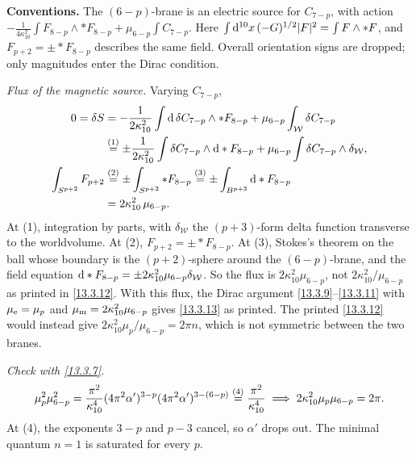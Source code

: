 \begin{tcolorbox}[breakable]
	\begin{remark}
		\textbf{Conventions.} The $(6-p)$-brane is an electric source for $C_{7-p}$, with action $-\frac{1}{4\kappa_{10}^2}\int F_{8-p}\wedge*F_{8-p}+\mu_{6-p}\int C_{7-p}$. Here $\int\mathrm{d}^{10}x\,(-G)^{1/2}|F|^2=\int F\wedge*F$, and $F_{p+2}=\pm*F_{8-p}$ describes the same field. Overall orientation signs are dropped; only magnitudes enter the Dirac condition.

		\textit{Flux of the magnetic source.} Varying $C_{7-p}$,
		\begin{align*}
			0=\delta S &= -\frac{1}{2\kappa_{10}^2}\int \mathrm{d}\,\delta C_{7-p}\wedge*F_{8-p} + \mu_{6-p}\int_{\mathcal W}\delta C_{7-p}\\
			&\overset{(1)}{=} \pm\frac{1}{2\kappa_{10}^2}\int\delta C_{7-p}\wedge\mathrm{d}*F_{8-p} + \mu_{6-p}\int\delta C_{7-p}\wedge\delta_{\mathcal W} ,\\
			\int_{S^{p+2}}F_{p+2} &\overset{(2)}{=} \pm\int_{S^{p+2}}*F_{8-p} \overset{(3)}{=} \pm\int_{B^{p+3}}\mathrm{d}*F_{8-p}\\
			&= 2\kappa_{10}^2\,\mu_{6-p} .
		\end{align*}
		At (1), integration by parts, with $\delta_{\mathcal W}$ the $(p+3)$-form delta function transverse to the worldvolume. At (2), $F_{p+2}=\pm*F_{8-p}$. At (3), Stokes's theorem on the ball whose boundary is the $(p+2)$-sphere around the $(6-p)$-brane, and the field equation $\mathrm{d}*F_{8-p}=\pm2\kappa_{10}^2\mu_{6-p}\delta_{\mathcal W}$. So the flux is $2\kappa_{10}^2\mu_{6-p}$, not $2\kappa_{10}^2/\mu_{6-p}$ as printed in \eqref{13.3.12}. With this flux, the Dirac argument \eqref{13.3.9}--\eqref{13.3.11} with $\mu_{\rm e}=\mu_p$ and $\mu_{\rm m}=2\kappa_{10}^2\mu_{6-p}$ gives \eqref{13.3.13} as printed. The printed \eqref{13.3.12} would instead give $2\kappa_{10}^2\mu_p/\mu_{6-p}=2\pi n$, which is not symmetric between the two branes.

		\textit{Check with \eqref{13.3.7}.}
		\begin{align*}
			\mu_p^2\mu_{6-p}^2 = \frac{\pi^2}{\kappa_{10}^4}(4\pi^2\alpha')^{3-p}(4\pi^2\alpha')^{3-(6-p)} \overset{(4)}{=} \frac{\pi^2}{\kappa_{10}^4}
			\;\Longrightarrow\; 2\kappa_{10}^2\mu_p\mu_{6-p} = 2\pi .
		\end{align*}
		At (4), the exponents $3-p$ and $p-3$ cancel, so $\alpha'$ drops out. The minimal quantum $n=1$ is saturated for every $p$.
	\end{remark}
\end{tcolorbox}

